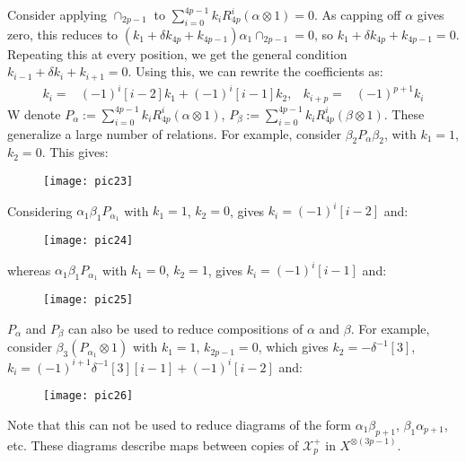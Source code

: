 \documentclass[]{article}
\begin{document}
Consider applying $\cap_{2p-1}$ to $\sum\limits_{i=0}^{4p-1} k_{i}R^{i}_{4p}(\alpha\otimes 1)=0$. As capping off $\alpha$ gives zero, this reduces to $(k_{1}+\delta k_{4p}+k_{4p-1})\alpha_{1}\cap_{2p-1}=0$, so $k_{1}+\delta k_{4p}+k_{4p-1}=0$. Repeating this at every position, we get the general condition $k_{i-1}+\delta k_{i}+k_{i+1}=0$. Using this, we can rewrite the coefficients as:
\begin{align*}
k_{i}=& (-1)^{i}[i-2]k_{1}+(-1)^{i}[i-1]k_{2},& k_{i+p}=&(-1)^{p+1}k_{i}
\end{align*}
W denote $P_{\alpha}:=\sum\limits_{i=0}^{4p-1} k_{i}R^{i}_{4p}(\alpha\otimes 1)$, $P_{\beta}:=\sum\limits_{i=0}^{4p-1} k_{i}R^{i}_{4p}(\beta\otimes 1)$. These generalize a large number of relations. For example, consider $\beta_{2}P_{\alpha}\beta_{2}$, with $k_{1}=1$, $k_{2}=0$. This gives:
\begin{figure}[H]
	\centering
	\texttt{[image: pic23]}
\end{figure}
Considering $\alpha_{1}\beta_{1}P_{\alpha_{1}}$ with $k_{1}=1$, $k_{2}=0$, gives $k_{i}=(-1)^{i}[i-2]$ and:
\begin{figure}[H]
	\centering
	\texttt{[image: pic24]}
\end{figure}
whereas $\alpha_{1}\beta_{1}P_{\alpha_{1}}$ with $k_{1}=0$, $k_{2}=1$, gives $k_{i}=(-1)^{i}[i-1]$ and:
\begin{figure}[H]
	\centering
	\texttt{[image: pic25]}
\end{figure}
$P_{\alpha}$ and $P_{\beta}$ can also be used to reduce compositions of $\alpha$ and $\beta$. For example, consider $\beta_{3}(P_{\alpha_{1}}\otimes 1)$ with $k_{1}=1$, $k_{2p-1}=0$, which gives $k_{2}=-\delta^{-1}[3]$, $k_{i}=(-1)^{i+1}\delta^{-1}[3][i-1]+(-1)^{i}[i-2]$ and:
\begin{figure}[H]
	\centering
	\texttt{[image: pic26]}
\end{figure}
Note that this can not be used to reduce diagrams of the form $\alpha_{1}\beta_{p+1}$, $\beta_{1}\alpha_{p+1}$, etc. These diagrams describe maps between copies of $\mathcal{X}^{+}_{p}$ in $X^{\otimes(3p-1)}$.\\
\end{document}
